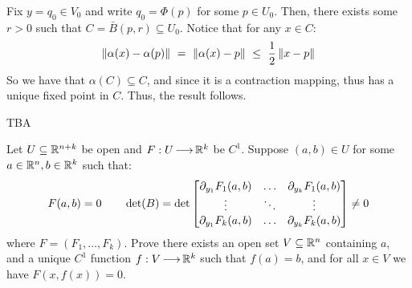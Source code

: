 \begin{pf}[title=Item 2]
    Fix $ y = q_{0} \in V_{0} $ and write $ q_{0} = \Phi(p) $ for some
    $ p \in U_{0} $. Then, there exists some $ r > 0 $ such that
    $ C = \bar{B}(p, r) \subseteq U_{0} $. Notice that for any $ x \in C $:
    \begin{equation*}
        \norm{\alpha(x)-\alpha(p)} \ = \ \norm{\alpha(x)-p} \ \leq \ \frac{1}{2}
        \norm{x-p}
    \end{equation*}
    So we have that $ \alpha(C) \subseteq C $, and since it is a contraction
    mapping, thus has a unique fixed point in $ C $. Thus, the result follows.
\end{pf}

\begin{pf}[title=Items 3 and 4]
    TBA
\end{pf}

\newpage
\begin{thm}[num=7.5,title=Implicit Function Theorem]
    Let $ U \subseteq \mathbb{R}^{n+k} $ be open and $ F: U \operatorname{\longrightarrow} \mathbb{R}^{k} $ be
    $ C^{1} $. Suppose $ (a, b) \in U $ for some $ a \in \mathbb{R}^{n}, b \in \mathbb{R}^{k} $
    such that:
    \begin{equation*}
        F(a, b) = 0 \qquad \det(B) = \det
        \begin{bmatrix}
            \partial_{y_{1}}F_{1}(a,b) & \dots & \partial_{y_{k}}F_{1}(a,b) \\
            \vdots & \ddots & \vdots \\
            \partial_{y_{1}}F_{k}(a,b) & \dots & \partial_{y_{k}}F_{k}(a,b)
        \end{bmatrix}
        \neq 0
    \end{equation*}
    where $ F = (F_{1},\dots,F_{k}) $. \vsp
    Prove there exists an open set $ V \subseteq \mathbb{R}^{n} $ containing $ a $, and
    a unique $ C^{1} $ function $ f:V \operatorname{\longrightarrow} \mathbb{R}^{k} $ such that $ f(a) = b $, and
    for all $ x \in V $ we have $ F(x,f(x)) = 0 $.
\end{thm}

